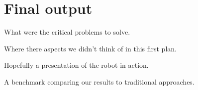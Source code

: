 \documentclass[a4paper,11pt,english]{article}
\begin{document}
\section{Final output}
What were the critical problems to solve.

Where there aspects we didn't think of in this first plan.

Hopefully a presentation of the robot in action.

A benchmark comparing our results to traditional approaches. 


\newpage


\end{document}
